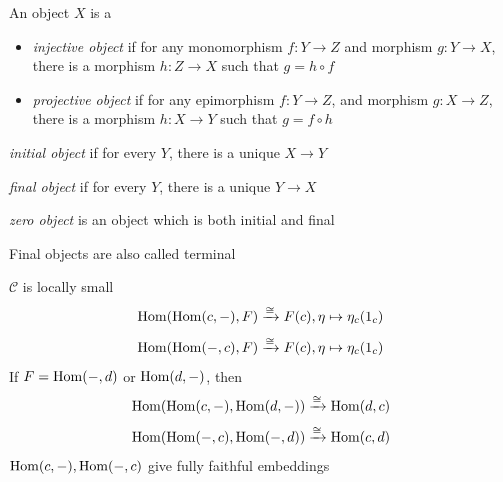 \documentclass[main]{subfiles}
\begin{document}
\begin{definition}
An object $X$ is a
\begin{itemize}
\item \textit{injective object} if for any monomorphism $f:Y\to Z$ and morphism $g:Y\to X$, there is a morphism $h:Z\to X$ such that $g=h\circ f$
\begin{center}
\end{center}
\item \textit{projective object} if for any epimorphism $f:Y\to Z$, and morphism $g:X\to Z$, there is a morphism $h:X\to Y$ such that $g=f\circ h$
\begin{center}
\end{center}
\end{itemize}
\item \textit{initial object} if for every $Y$, there is a unique $X\to Y$
\item \textit{final object} if for every $Y$, there is a unique $Y\to X$
\item \textit{zero object} is an object which is both initial and final
\end{definition}

\begin{remark}
Final objects are also called terminal
\end{remark}

\begin{lemma}\label{Yoneda lemma}
$\mathscr C$ is locally small
\[\operatorname{Hom}(\operatorname{Hom}(c,-),F)\xrightarrow{\cong} F(c), \eta\mapsto\eta_c(1_c)\]
\[\operatorname{Hom}(\operatorname{Hom}(-,c),F)\xrightarrow{\cong} F(c), \eta\mapsto\eta_c(1_c)\]
If $F=\operatorname{Hom}(-,d)$ or $\operatorname{Hom}(d,-)$, then
\[\operatorname{Hom}(\operatorname{Hom}(c,-),\operatorname{Hom}(d,-))\xrightarrow{\cong}\operatorname{Hom}(d,c)\]
\[\operatorname{Hom}(\operatorname{Hom}(-,c),\operatorname{Hom}(-,d))\xrightarrow{\cong}\operatorname{Hom}(c,d)\]
$\operatorname{Hom}(c,-), \operatorname{Hom}(-,c)$ give fully faithful embeddings
\end{lemma}
\end{document}
